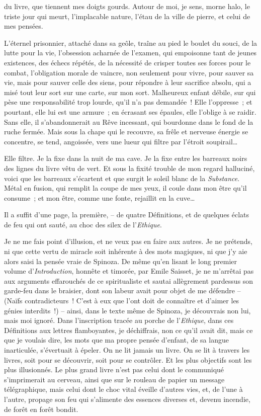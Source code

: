 \quebra

\noindent{}du livre,
que tiennent mes doigts gourds. Autour de moi, je sens, morne halo, le
triste jour qui meurt, l'implacable nature, l'étau de la ville de
pierre, et celui de mes pensées.

L'éternel prisonnier, attaché dans sa geôle, traîne au pied le boulet du
souci, de la lutte pour la vie, l'obsession acharnée de l'examen, qui
empoisonne tant de jeunes existences, des échecs répétés, de la
nécessité de crisper toutes ses forces pour le combat, l'obligation
morale de vaincre, non seulement pour vivre, pour sauver sa vie, mais
pour sauver celle des siens, pour répondre à leur sacrifice absolu, qui
a misé tout leur sort sur une carte, sur mon sort. Malheureux enfant
débile, sur qui pèse une responsabilité trop lourde, qu'il n'a pas
demandée~! Elle l'oppresse~; et pourtant, elle lui est une armure~; en
écrasant ses épaules, elle l'oblige à se raidir. Sans elle, il
s'abandonnerait au Rêve incessant, qui bourdonne dans le fond de la
ruche fermée. Mais sous la chape qui le recouvre, sa frêle et nerveuse
énergie se concentre, se tend, angoissée, vers une lueur qui filtre par
l'étroit soupirail\ldots{}

\quebra

Elle filtre. Je la fixe dans la nuit de ma cave. Je la fixe entre les
barreaux noirs des lignes du livre vêtu de vert. Et sous la fixité
trouble de mon regard halluciné, voici que les barreaux s'écartent et
que surgit le soleil blanc de la \emph{Substance}. Métal en fusion, qui
remplit la coupe de mes yeux, il coule dans mon être qu'il consume~; et
mon être, comme une fonte, rejaillit en la cuve\ldots{}

Il a suffit d'une page, la première, -- de quatre Définitions, et de
quelques éclats de feu qui ont sauté, au choc des silex de
l'\emph{Ethique}.

Je ne me fais point d'illusion, et ne veux pas en faire aux autres. Je
ne prétends, ni que cette vertu de miracle soit inhérente à des mots
magiques, ni que j'y aie alors saisi la pensée vraie de Spinoza. De même
qu'en lisant le long premier volume d'\emph{Introduction}, honnête et
timorée, par Emile Saisset, je ne m'arrêtai pas aux arguments
effarouchés de ce spiritualiste et sautai allègrement pardessus son
garde-feu dans le braisier, dont son labeur avait pour objet de me
défendre -- (Naïfs contradicteurs~! C'est à eux que l'ont doit de
connaître et d'aimer les génies interdits~!) -- ainsi, dans le texte
même de Spinoza, je découvrais non lui, mais moi ignoré. Dans
l'inscription tracée au porche de l'\emph{Ethique}, dans ces Définitions
aux lettres flamboyantes, je déchiffrais, non ce qu'il avait dit, mais
ce que je voulais dire, les mots que ma propre pensée d'enfant, de sa
langue inarticulée, s'évertuait à épeler. On ne lit jamais un livre. On
se lit à travers les livres, soit pour se découvrir, soit pour se
contrôler. Et les plus objectifs sont les plus illusionnés. Le plus
grand livre n'est pas celui dont le communiqué s'imprimerait au cerveau,
ainsi que sur le rouleau de papier un message télégraphique, mais celui
dont le choc vital éveille d'autres vies, et, de l'une à l'autre,
propage son feu qui s'alimente des essences diverses et, devenu
incendie, de forêt en forêt bondit.


